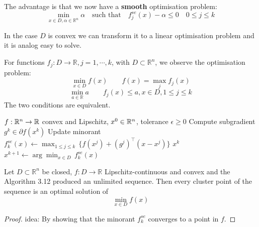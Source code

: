 The advantage is that we now have a \textbf{smooth} optimisation problem:
\begin{equation}
	\min_{x \in D, \alpha \in \mathbb{R}^n} \alpha \quad \text{such that} \quad f_j^{se}(x) - \alpha \leq 0 \quad 0 \leq j \leq k
\end{equation}

In the case $D$ is convex we can transform it to a linear optimisation problem and it is analog easy to solve.

\begin{lemma}
	For functions $f_j: D \longrightarrow \mathbb{R}, j = 1, \cdots, k$, with $D \subset \mathbb{R}^n$, we observe the optimisation problem:
	\begin{equation}
		\min_{x \in D} f(x) \qquad f(x) = \max_j f_j(x)
	\end{equation}
	\begin{equation}
		\min_{ a \in \mathbb{R} } a \qquad f_j(x) \leq a, x\in D, 1 \leq j \leq k
	\end{equation}
	The two conditions are equivalent.
\end{lemma}

\begin{algorithm}
\caption{Cutting-plane method (Kelley)}
\begin{algorithmic}[1]
\Require $f:\mathbb{R}^n \to \mathbb{R}$ convex and Lipschitz, $x^0 \in \mathbb{R}^n$, tolerance $\epsilon \ge 0$
  \State Compute subgradient $g^k \in \partial f(x^k)$
  \State Update minorant $f_k^{se}(x) \gets \max_{1 \le j \le k}\,\{f(x^j) + (g^j)^\top(x - x^j)\}$
    \State \Return $x^k$
  \EndIf
  \State $x^{k+1} \gets \arg\min_{x \in D}\, f_k^{se}(x)$
\EndFor
\end{algorithmic}
\end{algorithm}


\begin{theorem}
	Let $ D \subset \mathbb{R}^n$  be closed, $f: D \longrightarrow \mathbb{R}$ Lipschitz-continuous and convex and the Algorithm 3.12 produced an unlimited sequence. Then every cluster point of the sequence is an optimal solution of
		\begin{equation*}
			\min_{x \in D} f(x)
		\end{equation*}
\end{theorem}

\begin{proof}
	idea: By showing that the minorant $f^{se}_k$ converges to a point in $f$.
\end{proof}


